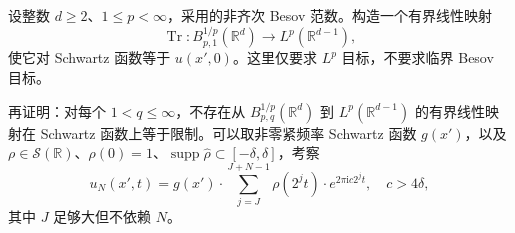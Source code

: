 \begin{optionalexercise}\label{b2:ex:19-new-3}
设整数 \(d\geq2\)、\(1\leq p<\infty\)，采用的非齐次 Besov 范数。构造一个有界线性映射
\[
 \operatorname{Tr}:B^{1/p}_{p,1}(\mathbb R^d)
       \longrightarrow L^p(\mathbb R^{d-1}),
\]
使它对 Schwartz 函数等于 \(u(x',0)\)。这里仅要求 \(L^p\) 目标，不要求临界 Besov 目标。

\ProseParagraphBreak

再证明：对每个 \(1<q\leq\infty\)，不存在从
\(B^{1/p}_{p,q}(\mathbb R^d)\) 到 \(L^p(\mathbb R^{d-1})\) 的有界线性映射在 Schwartz 函数上等于限制。可以取非零紧频率 Schwartz 函数 \(g(x')\)，以及 \(\rho\in\mathcal S(\mathbb R)\)、\(\rho(0)=1\)、\(\operatorname{supp}\widehat\rho\subset[-\delta,\delta]\)，考察
\[
 u_N(x',t)=g(x')\cdot
     \sum_{j=J}^{J+N-1}\rho(2^jt)\cdot e^{2\pi\mathrm i c2^jt},
 \quad c>4\delta,
\]
其中 \(J\) 足够大但不依赖 \(N\)。
\end{optionalexercise}
